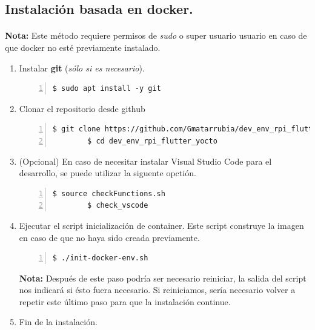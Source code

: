 \subsection{Instalación basada en docker.}

\paragraph{}\textbf{Nota:} Este método requiere permisos de \emph{sudo} o super usuario
usuario en caso de que docker no esté previamente instalado.

\begin{enumerate}
    \item Instalar \textbf{\gls{git}} (\emph{sólo si es necesario}).
    \begin{lstlisting}[style=consola, numbers=left]
        $ sudo apt install -y git
    \end{lstlisting}

    \item Clonar el repositorio desde github
    \begin{lstlisting}[style=consola, numbers=left]
        $ git clone https://github.com/Gmatarrubia/dev_env_rpi_flutter_yocto.git
        $ cd dev_env_rpi_flutter_yocto
    \end{lstlisting}

    \item (Opcional) En caso de necesitar instalar Visual Studio Code para el desarrollo,
    se puede utilizar la siguente opctión.
    \begin{lstlisting}[style=consola, numbers=left]
        $ source checkFunctions.sh
        $ check_vscode
    \end{lstlisting}

    \item Ejecutar el script inicialización de container. Este script construye la
    imagen en caso de que no haya sido creada previamente.
    \begin{lstlisting}[style=consola, numbers=left]
        $ ./init-docker-env.sh
    \end{lstlisting}
    \textbf{Nota:} Después de este paso podría ser necesario reiniciar, la salida del
    script nos indicará si ésto fuera necesario. Si reiniciamos, sería necesario volver
    a repetir este último paso para que la instalación continue.

    \item Fin de la instalación.
\end{enumerate}

